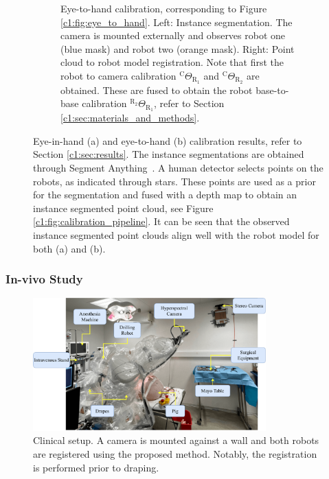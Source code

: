 \begin{figure}
\begin{subfigure}[b]{\textwidth}
         \caption{Eye-to-hand calibration, corresponding to Figure \ref{c1:fig:eye_to_hand}. Left: Instance segmentation. The camera is mounted externally and observes robot one (blue mask) and robot two (orange mask). Right: Point cloud to robot model registration. Note that first the robot to camera calibration $^\text{C}\Theta_{\text{R}_1}$ and $^\text{C}\Theta_{\text{R}_2}$ are obtained. These are fused to obtain the robot base-to-base calibration $^{\text{R}_2}\Theta_{\text{R}_1}$, refer to Section \ref{c1:sec:materials_and_methods}.}
         \label{c1:fig:double_registration}
     \end{subfigure}
     \caption{Eye-in-hand (a) and eye-to-hand (b) calibration results, refer to Section \ref{c1:sec:results}. The instance segmentations are obtained through Segment Anything~\citep{segment_anything}. A human detector selects points on the robots, as indicated through stars. These points are used as a prior for the segmentation and fused with a depth map to obtain an instance segmented point cloud, see Figure \ref{c1:fig:calibration_pipeline}. It can be seen that the observed instance segmented point clouds align well with the robot model for both (a) and (b).}
     \label{c1:fig:registration_results}
\end{figure}


\subsubsection{In-vivo Study}
\begin{figure}
    \centering
    \includegraphics[width=0.8\textwidth]{chapter_1/img/in_vivo_setup.pdf}
    \caption{Clinical setup. A camera is mounted against a wall and both robots are registered using the proposed method. Notably, the registration is performed prior to draping.}
    \label{c1:fig:in_vivo_setup}
\end{figure}



